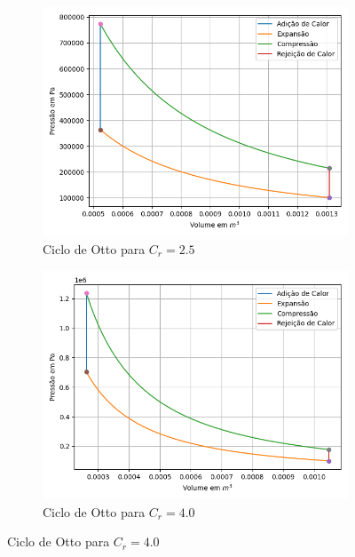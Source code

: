 \documentclass[10pt, conference, letterpaper]{IEEEtran}
\begin{document}
\begin{figure}[!ht]
    \centering
    
    \begin{subfigure}{0.45\textwidth}
        \includegraphics[width=\linewidth]{Imagens/grafico_cr25.png}
        \caption{Ciclo de Otto para \(C_r  = 2.5\) }
        \label{fig:cr25}
    \end{subfigure}
    \hfill
    \begin{subfigure}{0.45\textwidth}
        \includegraphics[width=\linewidth]{Imagens/grafico_cr40.png}
        \caption{Ciclo de Otto para \(C_r  = 4.0\) }
        \label{fig:cr40}
    \end{subfigure}
    

\end{figure}
\end{document}
